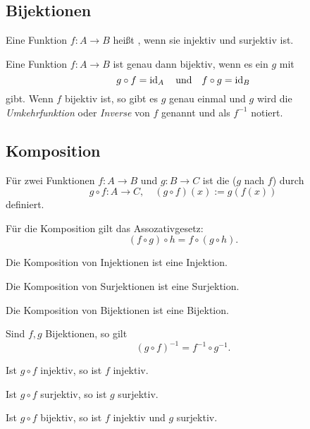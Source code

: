 \subsection{Bijektionen}
\begin{definition}[Bijektion]\mbox{}\newline
Eine Funktion $f\colon A\to B$ heißt ,
wenn sie injektiv und surjektiv ist.

Eine Funktion $f\colon A\to B$ ist genau dann bijektiv, wenn es
ein $g$ mit
\begin{equation}
g\circ f = \operatorname{id}_A\quad\text{und}\quad f\circ g = \operatorname{id}_B
\end{equation}
gibt. Wenn $f$ bijektiv ist, so gibt es $g$ genau einmal und
$g$ wird die \emph{Umkehrfunktion}
oder \emph{Inverse}
von $f$ genannt und als $f^{-1}$ notiert.
\end{definition}

\newpage
\subsection{Komposition}
\begin{definition}[Komposition]\mbox{}\newline
Für zwei Funktionen $f\colon A\to B$
und $g\colon B\to C$ ist die 
($g$ nach $f$)
durch
\begin{equation}\label{eq:composition}
g\circ f\colon A\to C,\quad (g\circ f)(x) := g(f(x))
\end{equation}
definiert.
\end{definition}
Für die Komposition gilt das Assozativgesetz:
\begin{equation}
(f\circ g)\circ h = f\circ(g\circ h).
\end{equation}

Die Komposition von Injektionen ist eine Injektion.

Die Komposition von Surjektionen ist eine Surjektion.

Die Komposition von Bijektionen ist eine Bijektion.

Sind $f,g$ Bijektionen, so gilt
\begin{equation}
(g\circ f)^{-1} = f^{-1}\circ g^{-1}.
\end{equation}

Ist $g\circ f$ injektiv, so ist $f$ injektiv.

Ist $g\circ f$ surjektiv, so ist $g$ surjektiv.

Ist $g\circ f$ bijektiv, so ist $f$ injektiv und $g$ surjektiv.

